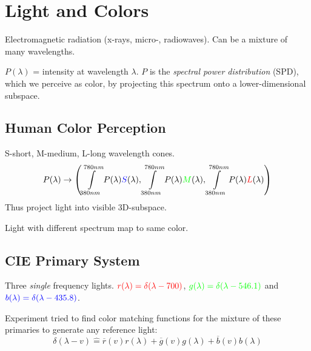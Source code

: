 \section{Light and Colors}

\begin{definition}[Light]
  Electromagnetic radiation (x-rays, micro-, radiowaves). Can be a mixture of many wavelengths.
\end{definition}

\begin{definition}[Color]
  \(P(\lambda)\) = intensity at wavelength \(\lambda\). \(P\) is the \textit{spectral power distribution} (SPD), which we perceive as color, by projecting this spectrum onto a lower-dimensional subspace.
\end{definition}

\subsection{Human Color Perception}

\begin{definition}[Cones]
    {\color{blue} S-short},
    {\color{green} M-medium},
    {\color{red} L-long} wavelength cones.
    \[P(\lambda) \to \left(\int\limits_{380nm}^{780nm}P(\lambda){\color{blue}S}(\lambda), \int\limits_{380nm}^{780nm}P(\lambda){\color{green}M}(\lambda), \int\limits_{380nm}^{780nm}P(\lambda){\color{red}L}(\lambda)\right)\]
    Thus project light into visible 3D-subspace.
\end{definition}

\begin{definition}[Metamers]
  Light with different spectrum map to same color.
\end{definition}

\subsection{CIE Primary System}

\begin{definition}[Primaries]
  Three \textit{single} frequency lights.
  \(\color{red} r(\lambda) = \delta(\lambda - 700)\), \(\color{green}g(\lambda) = \delta(\lambda - 546.1)\) and \(\color{blue}b(\lambda) = \delta(\lambda - 435.8)\).
\end{definition}

Experiment tried to find color matching functions for the mixture of these primaries to generate any reference light:
\[\delta(\lambda - v) \hat{=} \overline{r}(v)r(\lambda) + \overline{g}(v)g(\lambda) + \overline{b}(v) b(\lambda)\]

